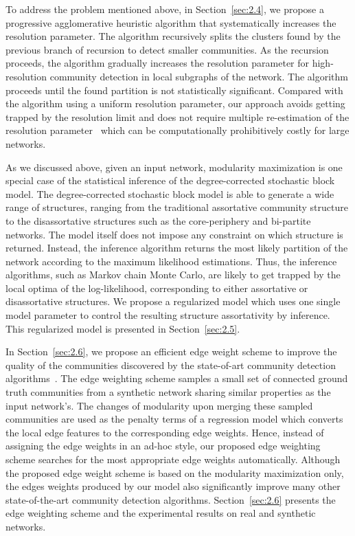 To address the problem mentioned above, in Section~\ref{sec:2.4}, we propose a progressive agglomerative heuristic algorithm that systematically increases the resolution parameter. The algorithm recursively splits the clusters found by the previous branch of recursion to detect smaller communities. As the recursion proceeds, the algorithm gradually increases the resolution parameter for high-resolution community detection in local subgraphs of the network. The algorithm proceeds until the found partition is not statistically significant. Compared with the algorithm using a uniform resolution parameter, our approach avoids getting trapped by the resolution limit and does not require multiple re-estimation of the resolution parameter~\cite{newman2016equivalence} which can be computationally prohibitively costly for large networks.

As we discussed above, given an input network, modularity maximization is one special case of the statistical inference of the degree-corrected stochastic block model. The degree-corrected stochastic block model is able to generate a wide range of structures, ranging from the traditional assortative community structure to the disassortative structures such as the core-periphery and bi-partite networks. The model itself does not impose any constraint on which structure is returned. Instead, the inference algorithm returns the most likely partition of the network according to the maximum likelihood estimations. Thus, the inference algorithms, such as Markov chain Monte Carlo, are likely to get trapped by the local optima of the log-likelihood, corresponding to either assortative or disassortative structures. We propose a regularized model which uses one single model parameter to control the resulting structure assortativity by inference. This regularized model is presented in Section~\ref{sec:2.5}.

In Section~\ref{sec:2.6}, we propose an efficient edge weight scheme to improve the quality of the communities discovered by the state-of-art community detection algorithms~\cite{lu2018adaptive}. The edge weighting scheme samples a small set of connected ground truth communities from a synthetic network sharing similar properties as the input network’s. The changes of modularity upon merging these sampled communities are used as the penalty terms of a regression model which converts the local edge features to the corresponding edge weights. Hence, instead of assigning the edge weights in an ad-hoc style, our proposed edge weighting scheme searches for the most appropriate edge weights automatically. Although the proposed edge weight scheme is based on the modularity maximization only, the edges weights produced by our model also significantly improve many other state-of-the-art community detection algorithms. Section~\ref{sec:2.6} presents the edge weighting scheme and the experimental results on real and synthetic networks.

